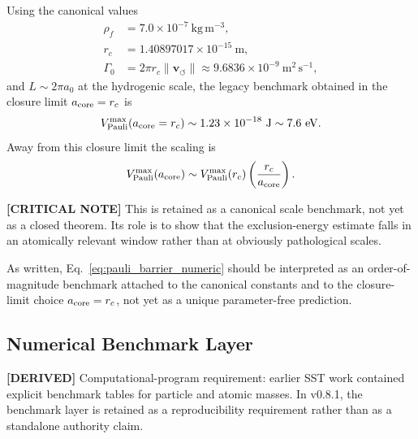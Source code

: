 \documentclass[11pt]{article}
\theoremstyle{definition}
\theoremstyle{plain}
\theoremstyle{remark}
\begin{document}
        Using the canonical values
        \begin{align}
            \rho_{\!f} &= 7.0 \times 10^{-7}\ \mathrm{kg\,m^{-3}}, \nonumber\\
            r_c &= 1.40897017 \times 10^{-15}\ \mathrm{m}, \nonumber\\
            \Gamma_0 &= 2\pi r_c \lVert \mathbf{v}_{\!\boldsymbol{\circlearrowleft}} \rVert
            \approx 9.6836\times 10^{-9}\ \mathrm{m^2\,s^{-1}},
        \end{align}
        and \(L \sim 2\pi a_0\) at the hydrogenic scale, the legacy
        benchmark obtained in the closure limit \(a_{\rm core}=r_c\) is
        \begin{align}
            V_{\mathrm{Pauli}}^{\max}(a_{\rm core}=r_c)
            \sim 1.23\times 10^{-18}\ \mathrm{J}
            \sim 7.6\ \mathrm{eV}.
            \label{eq:pauli_barrier_numeric}
        \end{align}
        Away from this closure limit the scaling is
        \begin{align}
            V_{\mathrm{Pauli}}^{\max}(a_{\rm core})
            \sim
            V_{\mathrm{Pauli}}^{\max}(r_c)
            \left(\frac{r_c}{a_{\rm core}}\right).
            \label{eq:pauli_barrier_acore_scaling}
        \end{align}

        \textbf{[CRITICAL NOTE]} This is retained as a canonical scale benchmark, not yet as a closed theorem. Its role is
        to show that the exclusion-energy estimate falls in an atomically relevant window rather than at obviously
        pathological scales.

        As written, Eq.~\eqref{eq:pauli_barrier_numeric} should be interpreted as an order-of-magnitude benchmark attached to the canonical constants and to the closure-limit choice \(a_{\rm core}=r_c\), not yet as a unique parameter-free prediction.

    \subsection{Numerical Benchmark Layer}
        \label{subsec:integration_benchmarks}

        \textbf{[DERIVED]} Computational-program requirement: earlier SST work contained explicit benchmark tables for particle and
        atomic masses. In v0.8.1, the benchmark layer is retained as a reproducibility requirement rather than as a
        standalone authority claim.
\end{document}
